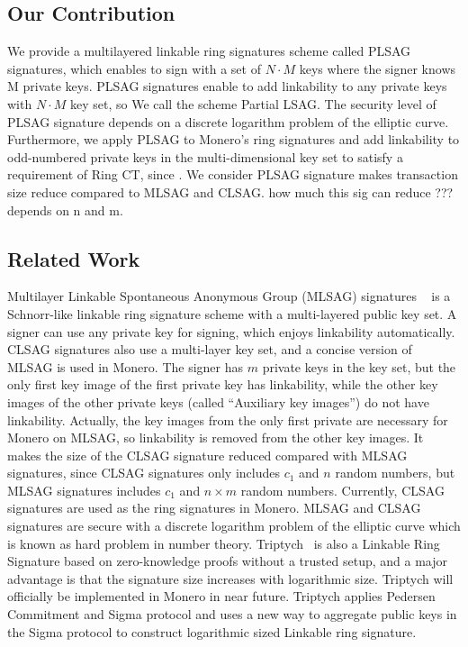 \subsection{Our Contribution}
    We provide a multilayered linkable ring signatures scheme called PLSAG signatures, which enables to sign with a set of $N\cdot M$ keys where the signer knows M private keys. PLSAG signatures enable to add linkability to any private keys with $N\cdot M$ key set, so We call the scheme Partial LSAG. The security level of PLSAG signature depends on a discrete logarithm problem of the elliptic curve. Furthermore, we apply PLSAG to Monero's ring signatures and add linkability to odd-numbered private keys in the multi-dimensional key set to satisfy a requirement of Ring CT, since . We consider PLSAG signature makes transaction size reduce compared to MLSAG and CLSAG. how much this sig can reduce ??? depends on n and m.

\subsection{Related Work}
    Multilayer Linkable Spontaneous Anonymous Group (MLSAG) signatures ~\cite{MLSAG} is a Schnorr-like linkable ring signature scheme with a multi-layered public key set. A signer can use any private key for signing, which enjoys linkability automatically. CLSAG signatures also use a multi-layer key set, and a concise version of MLSAG is used in Monero. The signer has $m$ private keys in the key set, but the only first key image of the first private key has linkability, while the other key images of the other private keys (called ``Auxiliary key images'') do not have linkability. Actually, the key images from the only first private are necessary for Monero on MLSAG, so linkability is removed from the other key images. It makes the size of the CLSAG signature reduced compared with MLSAG signatures, since CLSAG signatures only includes $c_{1}$ and $n$ random numbers, but MLSAG signatures includes $c_{1}$ and $n\times m$ random numbers. Currently, CLSAG signatures are used as the ring signatures in Monero. MLSAG and CLSAG signatures are secure with a discrete logarithm problem of the elliptic curve which is known as hard problem in number theory. Triptych~\cite{triptych} is also a Linkable Ring Signature based on zero-knowledge proofs without a trusted setup, and a major advantage is that the signature size increases with logarithmic size. Triptych will officially be implemented in Monero in near future. Triptych applies Pedersen Commitment and Sigma protocol and uses a new way to aggregate public keys in the Sigma protocol to construct logarithmic sized Linkable ring signature.
    
